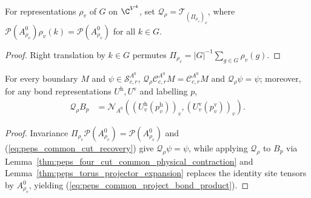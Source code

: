 \begin{definition}%
    \label{def:peps_four_cut_common_average_projection}
    \leanok
    For representations $\rho_v$ of $G$ on $\C^{V^4}$, set $\mathcal Q_\rho=\mathcal T_{(\Pi_{\rho_v})_v}$, where $\mathcal P(A^0_{\rho_v})\rho_v(k)=\mathcal P(A^0_{\rho_v})$ for all $k\in G$.
\end{definition}
\begin{proof}\leanok
    Right translation by $k\in G$ permutes $\Pi_{\rho_v}=|G|^{-1}\sum_{g\in G}\rho_v(g)$.
\end{proof}

\begin{lemma}%
    \label{thm:peps_four_cut_common_average_projection}
    \leanok
    For every boundary $M$ and $\psi\in\mathcal S^{A^0}_{c,r}$, $\mathcal Q_\rho\mathcal C^{A^0}_{c,r}M=\mathcal C^{A^0}_{c,r}M$ and $\mathcal Q_\rho\psi=\psi$; moreover, for any bond representations $U^{\mathrm h},U^{\mathrm v}$ and labelling $p$,
    \begin{align}
        \mathcal Q_\rho B_p
         & =\mathcal N_{A^0}
        ((U^{\mathrm h}_v(p^{\mathrm h}_v))_v,
        (U^{\mathrm v}_v(p^{\mathrm v}_v))_v).
        \label{eq:peps_common_project_bond_product}
    \end{align}
\end{lemma}
\begin{proof}\leanok
    Invariance $\Pi_{\rho_v}\mathcal P(A^0_{\rho_v})=\mathcal P(A^0_{\rho_v})$ and (\ref{eq:peps_common_cut_recovery}) give $\mathcal Q_\rho\psi=\psi$, while applying $\mathcal Q_\rho$ to $B_p$ via Lemma~\ref{thm:peps_four_cut_common_physical_contraction} and Lemma~\ref{thm:peps_torus_projector_expansion} replaces the identity site tensors by $A^0_{\rho_v}$, yielding (\ref{eq:peps_common_project_bond_product}).
\end{proof}


